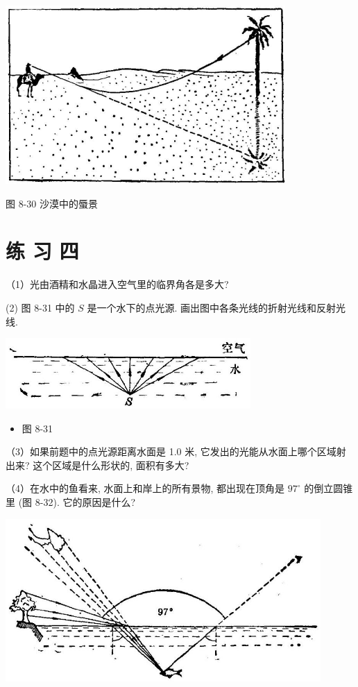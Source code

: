 \documentclass[10pt]{article}
\begin{document}
\begin{center}
\includegraphics[max width=0.8\textwidth]{images/01913056-1f15-74d8-9184-9aab52c9d66b_269_199484.jpg}
\end{center}

图 8-30 沙漠中的蜃景

\section*{练 习 四}

（1）光由酒精和水晶进入空气里的临界角各是多大?

(2) 图 8-31 中的 \(S\) 是一个水下的点光源. 画出图中各条光线的折射光线和反射光线.

\begin{center}
\includegraphics[max width=0.7\textwidth]{images/01913056-1f15-74d8-9184-9aab52c9d66b_269_979220.jpg}
\end{center}

\begin{itemize}
\item 图 8-31
\end{itemize}

（3）如果前题中的点光源距离水面是 1.0 米, 它发出的光能从水面上哪个区域射出来? 这个区域是什么形状的, 面积有多大?

（4）在水中的鱼看来, 水面上和岸上的所有景物, 都出现在顶角是 \({97}^{ \circ }\) 的倒立圆锥里 (图 8-32). 它的原因是什么?

\begin{center}
\includegraphics[max width=0.9\textwidth]{images/01913056-1f15-74d8-9184-9aab52c9d66b_270_241636.jpg}
\end{center}
\end{document}
